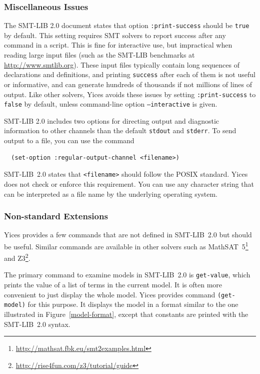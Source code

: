 \documentclass[11pt,twoside,fleqn,openright,titlepage]{cslreport}
\begin{document}
\subsubsection*{Miscellaneous Issues}

The SMT-LIB 2.0 document states that option \texttt{:print-success}
should be \texttt{true} by default. This setting requires SMT solvers
to report success after any command in a script. This is fine for
interactive use, but impractical when reading large input files (such
as the SMT-LIB benchmarks at \url{http://www.smtlib.org}). These
input files typically contain long sequences of declarations and
definitions, and printing \texttt{success} after each of them is not
useful or informative, and can generate hundreds of thousands if not
millions of lines of output.  Like other solvers, Yices avoids these
issues by setting \texttt{:print-success} to \texttt{false} by default,
unless command-line option \texttt{--interactive} is given.


\medskip\noindent SMT-LIB 2.0 includes two options for directing
output and diagnostic information to other channels than the default
\texttt{stdout} and \texttt{stderr}. To send output to a file, you can
use the command
\begin{small}
\begin{verbatim}
  (set-option :regular-output-channel <filename>)
\end{verbatim}
\end{small}
SMT-LIB~2.0 states that \texttt{<filename>} should follow the POSIX
standard. Yices does not check or enforce this requirement. You can
use any character string that can be interpreted as a file name by the
underlying operating system.


\subsubsection*{Non-standard Extensions}

Yices provides a few commands that are not defined in SMT-LIB~2.0 but
should be useful. Similar commands are available in other solvers such
as MathSAT~5\footnote{\url{http://mathsat.fbk.eu/smt2examples.html}} and
Z3\footnote{\url{http://rise4fun.com/z3/tutorial/guide}}.

\medskip\noindent The primary command to examine models in SMT-LIB~2.0
is \texttt{get-value}, which prints the value of a list of terms in
the current model. It is often more convenient to just display the
whole model.  Yices provides command \texttt{(get-model)} for this
purpose. It displays the model in a format similar to the one
illustrated in Figure~\ref{model-format}, except that constants are
printed with the SMT-LIB~2.0 syntax.
\end{document}
